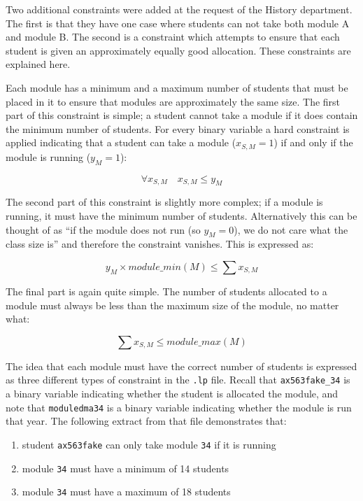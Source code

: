 Two additional constraints were added at the request of the History
department. The first is that they have one case where students can not take
both module A and module B. The second is a constraint which attempts to
ensure that each student is given an approximately equally good allocation.
These constraints are explained here.

\mynobreakpar

Each module has a minimum and a maximum number of students that must be placed
in it to ensure that modules are approximately the same size. The first part
of this constraint is simple; a student cannot take a module if it does
contain the minimum number of students. For every \studmod binary variable a
hard constraint is applied indicating that a student can take a module
($x_{S,M}=1$) if and only if the module is running ($y_M=1$):\mynobreakpar

$$
\forall x_{S,M} \quad x_{S,M} \leq y_M
$$

The second part of this constraint is slightly more complex; if a module is
running, it must have the minimum number of students. Alternatively this can
be thought of as ``if the module does not run (so $y_M=0$), we do not care
what the class size is'' and therefore the constraint vanishes. This is
expressed as:\mynobreakpar

$$
y_M \times module\_min(M) \leq \displaystyle\sum x_{S,M}
$$

The final part is again quite simple. The number of students allocated to a
module must always be less than the maximum size of the module, no matter
what:\mynobreakpar

$$
\displaystyle\sum x_{S,M} \leq module\_max(M)
$$

The idea that each module must have the correct number of students is
expressed as three different types of constraint in the \texttt{.lp} file.
Recall that \texttt{ax563fake\_34} is a binary variable indicating whether the
student is allocated the module, and note that \texttt{moduledma34} is a
binary variable indicating whether the module is run that year. The following
extract from that file demonstrates that:\mynobreakpar

\begin{enumerate}
  \item student \texttt{ax563fake} can only take module \texttt{34} if it is running
  \item module \texttt{34} must have a minimum of 14 students
  \item module \texttt{34} must have a maximum of 18 students
\end{enumerate}

